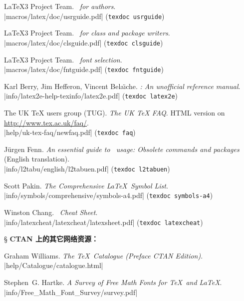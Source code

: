 \begin{thebibliography}{20}
 \LaTeX3 Project Team.
  \newblock \emph{\LaTeXe\ for authors}.\\
  \CTAN|macros/latex/doc/usrguide.pdf| (\texttt{texdoc usrguide})

 \LaTeX3 Project Team.
  \newblock \emph{\LaTeXe\ for class and package writers}. \\
  \CTAN|macros/latex/doc/clsguide.pdf| (\texttt{texdoc clsguide})

 \LaTeX3 Project Team.
  \newblock \emph{\LaTeXe\ font selection}. \\
  \CTAN|macros/latex/doc/fntguide.pdf| (\texttt{texdoc fntguide})

 Karl Berry, Jim Hefferon, Vincent Bela\"{\i}che.
  \newblock \emph{\LaTeXe: An unofficial reference manual}. \\
  \CTAN|info/latex2e-help-texinfo/latex2e.pdf| (\texttt{texdoc latex2e})

 The UK TeX users group (TUG).
  \newblock \emph{The UK TeX FAQ}. 
  \newblock HTML version on \url{http://www.tex.ac.uk/faq/}. \\
  \CTAN|help/uk-tex-faq/newfaq.pdf| (\texttt{texdoc faq})

 J\"{u}rgen Fenn.
  \newblock \emph{An essential guide to \LaTeXe\ usage: Obsolete commands and packages} (English translation). \\
  \CTAN|info/l2tabu/english/l2tabuen.pdf| (\texttt{texdoc l2tabuen})

 Scott Pakin.
  \newblock \emph{The Comprehensive \LaTeX\ Symbol List}. \\
  \CTAN|info/symbols/comprehensive/symbols-a4.pdf| (\texttt{texdoc symbols-a4})

 Winston Chang.
  \newblock \emph{\LaTeXe\ Cheat Sheet}. \\
  \CTAN|info/latexcheat/latexcheat/latexsheet.pdf| (\texttt{texdoc latexcheat})

\item[\S] {\bfseries CTAN 上的其它网络资源：}

 Graham Williams.
  \newblock \emph{The \TeX\ Catalogue (Preface CTAN Edition)}.\\
  \CTAN|help/Catalogue/catalogue.html|

 Stephen~G. Hartke.
  \newblock \emph{A Survey of Free Math Fonts for \TeX\ and \LaTeX}.\\
  \CTAN|info/Free_Math_Font_Survey/survey.pdf|


\end{thebibliography}
